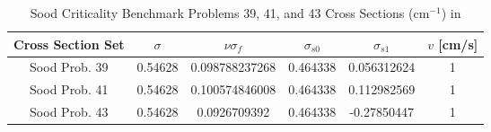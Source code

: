 \begin{table}[!htbp]
	\caption{Sood Criticality Benchmark Problems 39, 41, and 43 Cross Sections (cm$^{-1}$) in \cite{sood2003analytical}}
	\label{table:SoodUD2OAniso}
	\centering{}
    \begin{tabular}{*6c}
        \toprule
	Cross Section Set & $\sigma$ & $\nu \sigma_{f}$ & $\sigma_{s0}$  & $\sigma_{s1}$ & $v$ [cm/s] \\ 
        \midrule
	Sood Prob. 39  & 0.54628 & 0.098788237268 & 0.464338 & 0.056312624 & 1 \\
	Sood Prob. 41  & 0.54628 & 0.100574846008 & 0.464338 & 0.112982569 & 1 \\
	Sood Prob. 43  & 0.54628 & 0.0926709392 & 0.464338 & -0.27850447 & 1 \\
        \bottomrule
    \end{tabular}
\end{table}

